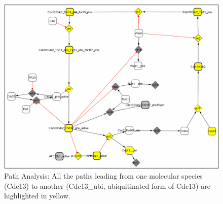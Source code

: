\begin{figure}
\centering
\includegraphics[width=14 cm]{graphics/Path_Analysis_All_the_paths}
\caption{Path Analysis: All the paths leading from one molecular species (Cdc13) to another (Cdc13\_ubi, ubiquitinated form of Cdc13) are highlighted in yellow.}
\label{Path_Analysis_All_the_paths}
\end{figure}

